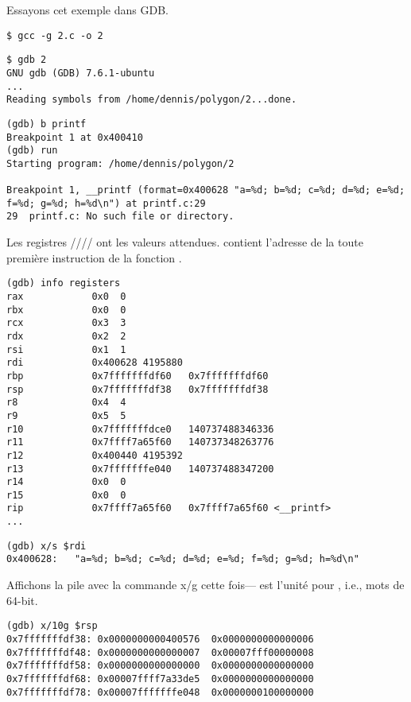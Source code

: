 Essayons cet exemple dans \ac{GDB}.

\begin{lstlisting}
$ gcc -g 2.c -o 2
\end{lstlisting}

\begin{lstlisting}
$ gdb 2
GNU gdb (GDB) 7.6.1-ubuntu
...
Reading symbols from /home/dennis/polygon/2...done.
\end{lstlisting}

\begin{lstlisting}[caption=mettons le point d'arrêt à \printf{,} et lançons]
(gdb) b printf
Breakpoint 1 at 0x400410
(gdb) run
Starting program: /home/dennis/polygon/2 

Breakpoint 1, __printf (format=0x400628 "a=%d; b=%d; c=%d; d=%d; e=%d; f=%d; g=%d; h=%d\n") at printf.c:29
29	printf.c: No such file or directory.
\end{lstlisting}

Les registres \RSI/\RDX/\RCX// ont les valeurs attendues.
\RIP contient l'adresse de la toute première instruction de la fonction \printf.

\begin{lstlisting}
(gdb) info registers
rax            0x0	0
rbx            0x0	0
rcx            0x3	3
rdx            0x2	2
rsi            0x1	1
rdi            0x400628	4195880
rbp            0x7fffffffdf60	0x7fffffffdf60
rsp            0x7fffffffdf38	0x7fffffffdf38
r8             0x4	4
r9             0x5	5
r10            0x7fffffffdce0	140737488346336
r11            0x7ffff7a65f60	140737348263776
r12            0x400440	4195392
r13            0x7fffffffe040	140737488347200
r14            0x0	0
r15            0x0	0
rip            0x7ffff7a65f60	0x7ffff7a65f60 <__printf>
...
\end{lstlisting}

\begin{lstlisting}[caption=inspectons la chaîne de format]
(gdb) x/s $rdi
0x400628:	"a=%d; b=%d; c=%d; d=%d; e=%d; f=%d; g=%d; h=%d\n"
\end{lstlisting}

Affichons la pile avec la commande x/g cette fois--- est l'unité pour , i.e., mots de 64-bit.

\begin{lstlisting}
(gdb) x/10g $rsp
0x7fffffffdf38:	0x0000000000400576	0x0000000000000006
0x7fffffffdf48:	0x0000000000000007	0x00007fff00000008
0x7fffffffdf58:	0x0000000000000000	0x0000000000000000
0x7fffffffdf68:	0x00007ffff7a33de5	0x0000000000000000
0x7fffffffdf78:	0x00007fffffffe048	0x0000000100000000
\end{lstlisting}

